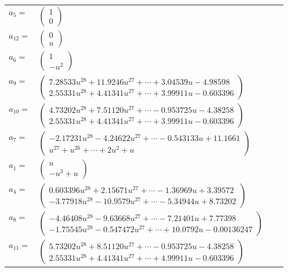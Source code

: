 \documentclass[1p]{elsarticle_modified}
\theoremstyle{definition}
\begin{document}
\begin{tabular}{m{7pt} m{180pt} m{7pt} m{180pt} }
\flushright $a_{5}=$&$\begin{pmatrix}1\\0\end{pmatrix}$ \\
\flushright $a_{12}=$&$\begin{pmatrix}0\\u\end{pmatrix}$ \\
\flushright $a_{6}=$&$\begin{pmatrix}1\\- u^2\end{pmatrix}$ \\
\flushright $a_{9}=$&$\begin{pmatrix}7.28533 u^{28}+11.9246 u^{27}+\cdots+3.04539 u-4.98598\\2.55331 u^{28}+4.41341 u^{27}+\cdots+3.99911 u-0.603396\end{pmatrix}$ \\
\flushright $a_{10}=$&$\begin{pmatrix}4.73202 u^{28}+7.51120 u^{27}+\cdots-0.953725 u-4.38258\\2.55331 u^{28}+4.41341 u^{27}+\cdots+3.99911 u-0.603396\end{pmatrix}$ \\
\flushright $a_{7}=$&$\begin{pmatrix}-2.17231 u^{28}-4.24622 u^{27}+\cdots-0.543133 u+11.1661\\u^{27}+u^{26}+\cdots+2 u^2+u\end{pmatrix}$ \\
\flushright $a_{1}=$&$\begin{pmatrix}u\\- u^3+u\end{pmatrix}$ \\
\flushright $a_{4}=$&$\begin{pmatrix}0.603396 u^{28}+2.15671 u^{27}+\cdots-1.36969 u+3.39572\\-3.77918 u^{28}-10.9579 u^{27}+\cdots-5.34944 u+8.73202\end{pmatrix}$ \\
\flushright $a_{8}=$&$\begin{pmatrix}-4.46408 u^{28}-9.63668 u^{27}+\cdots-7.21401 u+7.77398\\-1.75545 u^{28}-0.547472 u^{27}+\cdots+10.0792 u-0.00136247\end{pmatrix}$ \\
\flushright $a_{11}=$&$\begin{pmatrix}5.73202 u^{28}+8.51120 u^{27}+\cdots-0.953725 u-4.38258\\2.55331 u^{28}+4.41341 u^{27}+\cdots+4.99911 u-0.603396\end{pmatrix}$ \\

\end{tabular}
\end{document}
